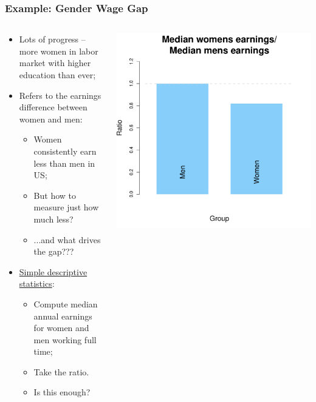 \documentclass[aspectratio=169]{beamer}
\theoremstyle{principle}
\begin{document}
\begin{frame}
\frametitle{Example: Gender Wage Gap}

\begin{columns}
\begin{column}{0.5\textwidth}

\begin{itemize}
\item Lots of progress -- more women in labor market with higher education than ever;
\bigskip
\item Refers to the earnings difference between women and men:
\begin{itemize}
\item Women consistently earn less than men in US;
\item But how to measure just how much less?
\item ...and what drives the gap???
\end{itemize}
\bigskip
\item \href{https://www.americanprogress.org/article/quick-facts-gender-wage-gap/}{Simple descriptive statistics}:
\begin{itemize}
\item Compute median annual earnings for women and men working full time;
\item Take the ratio.
\item[] \color{white} Is this enough?
\end{itemize}
\end{itemize}

\end{column}
\begin{column}{0.5\textwidth}
\includegraphics[scale=0.4]{gender_wage_gap.pdf}
\end{column}
\end{columns}

\end{frame}
\end{document}
